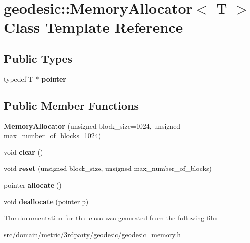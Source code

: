 \hypertarget{classgeodesic_1_1_memory_allocator}{}\section{geodesic\+:\+:Memory\+Allocator$<$ T $>$ Class Template Reference}
\label{classgeodesic_1_1_memory_allocator}
\subsection*{Public Types}
\begin{DoxyCompactItemize}
\item 
\hypertarget{classgeodesic_1_1_memory_allocator_a5bf49d03dcfd186a3e55d0766f6c7ac4}{}typedef T $\ast$ {\bfseries pointer}\label{classgeodesic_1_1_memory_allocator_a5bf49d03dcfd186a3e55d0766f6c7ac4}

\end{DoxyCompactItemize}
\subsection*{Public Member Functions}
\begin{DoxyCompactItemize}
\item 
\hypertarget{classgeodesic_1_1_memory_allocator_a991b8951be7af0e01bccf0d543fd9c69}{}{\bfseries Memory\+Allocator} (unsigned block\+\_\+size=1024, unsigned max\+\_\+number\+\_\+of\+\_\+blocks=1024)\label{classgeodesic_1_1_memory_allocator_a991b8951be7af0e01bccf0d543fd9c69}

\item 
\hypertarget{classgeodesic_1_1_memory_allocator_a169568619912780794522d946d58cd87}{}void {\bfseries clear} ()\label{classgeodesic_1_1_memory_allocator_a169568619912780794522d946d58cd87}

\item 
\hypertarget{classgeodesic_1_1_memory_allocator_a60563dcce45646630bba8b8a5533e087}{}void {\bfseries reset} (unsigned block\+\_\+size, unsigned max\+\_\+number\+\_\+of\+\_\+blocks)\label{classgeodesic_1_1_memory_allocator_a60563dcce45646630bba8b8a5533e087}

\item 
\hypertarget{classgeodesic_1_1_memory_allocator_aad7b63d11a97a054a8a7b45f29fdc391}{}pointer {\bfseries allocate} ()\label{classgeodesic_1_1_memory_allocator_aad7b63d11a97a054a8a7b45f29fdc391}

\item 
\hypertarget{classgeodesic_1_1_memory_allocator_a2ead9339bbb05eb76014b08bc1d5bfeb}{}void {\bfseries deallocate} (pointer p)\label{classgeodesic_1_1_memory_allocator_a2ead9339bbb05eb76014b08bc1d5bfeb}

\end{DoxyCompactItemize}


The documentation for this class was generated from the following file\+:\begin{DoxyCompactItemize}
\item 
src/domain/metric/3rdparty/geodesic/geodesic\+\_\+memory.\+h\end{DoxyCompactItemize}
